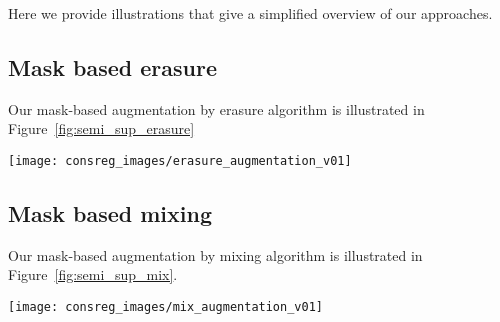 \documentclass{article}
\begin{document}
Here we provide illustrations that give a simplified overview of our approaches.

\subsection*{Mask based erasure}

Our mask-based augmentation by erasure algorithm is illustrated in Figure~\ref{fig:semi_sup_erasure}

\begin{figure*}[h]
\centering

\texttt{[image: consreg\_images/erasure\_augmentation\_v01]}


\caption{\label{fig:semi_sup_erasure}Illustration of the unsupervised mask based erasure consistency loss component of semi-supervised image
classification. Blue arrows carry image or mask content and grey arrows carry probability vectors. Note that confidence thresholding is not illustrated here.
}
\vspace{-1em}
\end{figure*}


 \subsection*{Mask based mixing}

Our mask-based augmentation by mixing algorithm is illustrated in Figure~\ref{fig:semi_sup_mix}.

\begin{figure*}[h]
\centering
\texttt{[image: consreg\_images/mix\_augmentation\_v01]}

\caption{\label{fig:semi_sup_mix}Illustration of the unsupervised masked based mixing loss component of semi-supervised image classification. Blue arrows carry image or mask content, grey arrows carry probability vectors and yellow carry scalars. Please note that confidence thresholding is not illustrated here.
}
\vspace{-1em}
\end{figure*}
\end{document}

